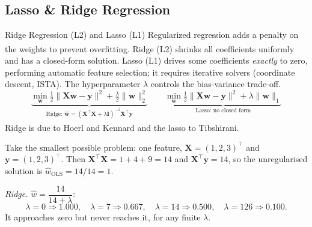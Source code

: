 \subsection{Lasso \& Ridge Regression}

\begin{v3topic}{Ridge Regression (L2) and Lasso (L1)}
    Regularized regression adds a penalty on the weights to prevent overfitting\textsuperscript{\cite[][pp.~91--97]{iiiCourseMachineLearning}}. Ridge (L2) shrinks all coefficients uniformly and has a closed-form solution. Lasso (L1) drives some coefficients \emph{exactly} to zero, performing automatic feature selection; it requires iterative solvers (coordinate descent, ISTA). The hyperparameter $\lambda$ controls the bias-variance trade-off.
\visualseparator
    \begin{equation}
        \underbrace{\min_{\mathbf{w}} \tfrac{1}{2}\|\mathbf{X}\mathbf{w}-\mathbf{y}\|^2 + \tfrac{\lambda}{2}\|\mathbf{w}\|_2^2}_{\text{Ridge: } \hat{\mathbf{w}}=(\mathbf{X}^\top\mathbf{X}+\lambda\mathbf{I})^{-1}\mathbf{X}^\top\mathbf{y}}
        \qquad
        \underbrace{\min_{\mathbf{w}} \tfrac{1}{2}\|\mathbf{X}\mathbf{w}-\mathbf{y}\|^2 + \lambda\|\mathbf{w}\|_1}_{\text{Lasso: no closed form}}
        \label{eq:ml-ridge-lasso}
    \end{equation}
    Ridge is due to Hoerl and
    Kennard\textsuperscript{\cite{hoerlRidgeRegressionBiased1970}} and the lasso
    to Tibshirani\textsuperscript{\cite{tibshiraniRegressionShrinkageSelection1996}}.

\begin{workedexample}
Take the smallest possible problem: one feature, $\mathbf{X} = (1,2,3)^{\!\top}$
and $\mathbf{y} = (1,2,3)^{\!\top}$. Then
$\mathbf{X}^{\!\top}\mathbf{X} = 1+4+9 = 14$ and
$\mathbf{X}^{\!\top}\mathbf{y} = 14$, so the unregularised solution is
$\hat w_{\text{OLS}} = 14/14 = 1$.

\emph{Ridge.} $\hat w = \dfrac{14}{14+\lambda}$:
\[
  \lambda = 0 \Rightarrow 1.000,\quad
  \lambda = 7 \Rightarrow 0.667,\quad
  \lambda = 14 \Rightarrow 0.500,\quad
  \lambda = 126 \Rightarrow 0.100 .
\]
It approaches zero but never reaches it, for any finite $\lambda$.


\end{workedexample}
\end{v3topic}
